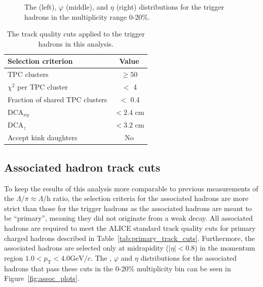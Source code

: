 \begin{figure}[t!]
\begin{minipage}{0.32\textwidth}
	\end{minipage}
	\caption{The \pt (left), $\varphi$ (middle), and $\eta$ (right) distributions for the trigger hadrons in the multiplicity range 0-20\%.}
	\label{fig:trigger_plots}
\end{figure}

\begin{table}[h]
	\centering
	\caption{The track quality cuts applied to the trigger hadrons in this analysis.}
	\label{tab:trigger_track_cuts}
	\begin{tabular}{ l  c }
		\hline
		Selection criterion & Value \\
		\hline
		TPC clusters & $\geq 50$ \\
		$\chi^{2}$ per TPC cluster  & $<$ 4 \\
		Fraction of shared TPC clusters & $<$ 0.4 \\
		DCA$_{xy}$ & $< 2.4$ cm \\
		DCA$_{z}$ & $< 3.2$ cm \\
		Accept kink daughters & No \\
		\hline
	\end{tabular}
\end{table}

\subsection{Associated hadron track cuts}

To keep the results of this analysis more comparable to previous measurements of the $\Lambda/\pi \approx \Lambda/$h ratio, the selection criteria for the associated hadrons are more strict than those for the trigger hadrons as the associated hadrons are meant to be ``primary'', meaning they did not originate from a weak decay. All associated hadrons are required to meet the ALICE standard track quality cuts for primary charged hadrons described in Table~\ref{tab:primary_track_cuts}. Furthermore, the associated hadrons are selected only at midrapidity ($|\eta| < 0.8$) in the momentum region ${1.0 < p_{\text{T}} < 4.0 \text{GeV}/c}$. The \pt, $\varphi$ and $\eta$ distributions for the associated hadrons that pass these cuts in the 0-20\% multiplicity bin can be seen in Figure~\ref{fig:assoc_plots}.


